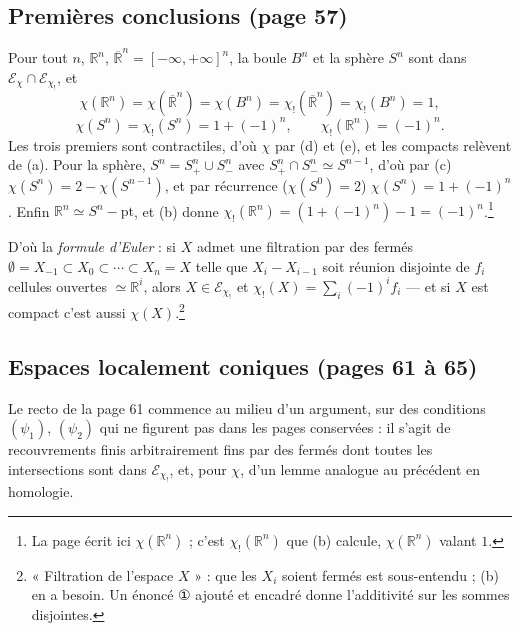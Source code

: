 \documentclass[11pt,a4paper]{article}
\begin{document}
\subsection*{Premières conclusions (page 57)}

Pour tout $n$, $\mathbb{R}^n$, $\overline{\mathbb{R}}^n = [-\infty,+\infty]^n$, la
boule $B^n$ et la sphère $S^n$ sont dans $\mathcal{E}_\chi \cap
\mathcal{E}_{\chi_!}$, et
\[
  \chi(\mathbb{R}^n) = \chi(\overline{\mathbb{R}}^n) = \chi(B^n) =
  \chi_!(\overline{\mathbb{R}}^n) = \chi_!(B^n) = 1,
\]
\[
  \chi(S^n) = \chi_!(S^n) = 1 + (-1)^n, \qquad
  \chi_!(\mathbb{R}^n) = (-1)^n .
\]
Les trois premiers sont contractiles, d'où $\chi$ par (d) et (e), et les
compacts relèvent de (a). Pour la sphère, $S^n = S^n_+ \cup S^n_-$ avec
$S^n_+ \cap S^n_- \simeq S^{n-1}$, d'où par (c) $\chi(S^n) = 2 - \chi(S^{n-1})$,
et par récurrence ($\chi(S^0) = 2$) $\chi(S^n) = 1 + (-1)^n$. Enfin
$\mathbb{R}^n \simeq S^n - \mathrm{pt}$, et (b) donne $\chi_!(\mathbb{R}^n) =
(1 + (-1)^n) - 1 = (-1)^n$.\footnote{La page écrit ici $\chi(\mathbb{R}^n)$ ;
c'est $\chi_!(\mathbb{R}^n)$ que (b) calcule, $\chi(\mathbb{R}^n)$ valant $1$.}

D'où la \emph{formule d'Euler} : si $X$ admet une filtration par des fermés
$\emptyset = X_{-1} \subset X_0 \subset \cdots \subset X_n = X$ telle que
$X_i - X_{i-1}$ soit réunion disjointe de $f_i$ cellules ouvertes
$\simeq \mathbb{R}^i$, alors $X \in \mathcal{E}_{\chi_!}$ et
$\chi_!(X) = \sum_i (-1)^i f_i$ — et si $X$ est compact c'est aussi
$\chi(X)$.\footnote{« Filtration de l'espace $X$ » : que les $X_i$ soient
fermés est sous-entendu ; (b) en a besoin. Un énoncé ① ajouté et encadré
donne l'additivité sur les sommes disjointes.}

\subsection*{Espaces localement coniques (pages 61 à 65)}

Le recto de la page 61 commence au milieu d'un argument, sur des conditions
$(\psi_1)$, $(\psi_2)$ qui ne figurent pas dans les pages conservées : il
s'agit de recouvrements finis arbitrairement fins par des fermés dont toutes
les intersections sont dans $\mathcal{E}_{\chi_!}$, et, pour $\chi$, d'un
lemme analogue au précédent en homologie.
\end{document}
